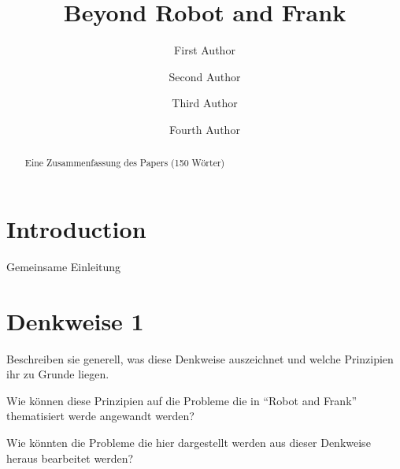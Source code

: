 \documentclass[sigchi-a, authorversion]{acmart}
\begin{document}
\title{Beyond Robot and Frank}

\author{First Author}

\author{Second Author}

\author{Third Author}

\author{Fourth Author}

\renewcommand{\shortauthors}{F. Author et al.}

\maketitle

\begin{abstract}
    Eine Zusammenfassung des Papers (150 Wörter)

\end{abstract}

\section{Introduction}

Gemeinsame Einleitung



\section{Denkweise 1}

Beschreiben sie generell, was diese Denkweise auszeichnet und welche Prinzipien ihr zu Grunde liegen.

Wie können diese Prinzipien auf die Probleme die in ``Robot and Frank'' thematisiert werde angewandt werden?

Wie könnten die Probleme die hier dargestellt werden aus dieser Denkweise heraus bearbeitet werden?

\end{document}
